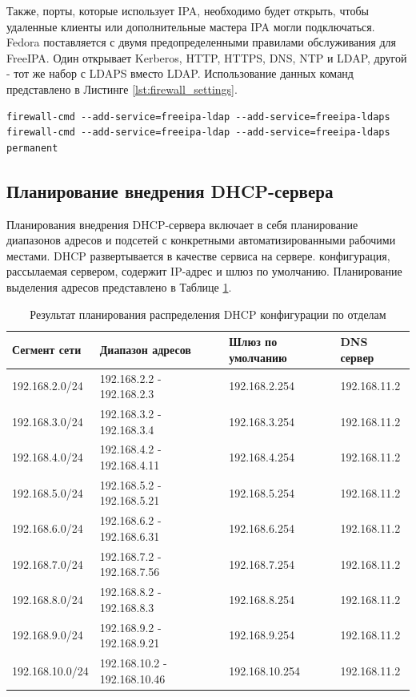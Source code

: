 \documentclass[14pt, a4paper]{extarticle}
\numberwithin{equation}{section}
\begin{document}
Также, порты, которые использует IPA, необходимо будет 
открыть, чтобы удаленные клиенты или дополнительные мастера IPA могли подключаться. 
Fedora поставляется с двумя предопределенными правилами обслуживания для FreeIPA. 
Один открывает Kerberos, HTTP, HTTPS, DNS, NTP и LDAP, другой - тот же набор с LDAPS вместо LDAP. 
Использование данных команд представлено в Листинге \ref{lst:firewall_settings}. 
\begin{lstlisting}[caption={Команды брандмауэра\label{lst:firewall_settings}}]
firewall-cmd --add-service=freeipa-ldap --add-service=freeipa-ldaps 
firewall-cmd --add-service=freeipa-ldap --add-service=freeipa-ldaps permanent 
\end{lstlisting}


\subsection{Планирование внедрения DHCP-сервера}
Планирования внедрения DHCP-сервера включает в себя планирование 
диапазонов адресов и подсетей с конкретными автоматизированными рабочими местами.
DHCP развертывается в качестве сервиса на сервере. 
конфигурация, рассылаемая сервером, содержит IP-адрес и шлюз по умолчанию.
Планирование выделения адресов представлено в Таблице \ref{table:dhcp_plan}.

\begin{table}[H]
\centering
\small
\caption{Результат планирования распределения DHCP конфигурации по отделам}
\label{table:dhcp_plan}
\begin{tabular}{|l|l|m{2.5cm}|m{2.5cm}|}
\hline
\textbf{Сегмент сети} & \textbf{Диапазон адресов} & \textbf{Шлюз по умолчанию} & \textbf{DNS сервер}\\
\hline
192.168.2.0/24 & 192.168.2.2 - 192.168.2.3 & 192.168.2.254  & 192.168.11.2\\
\hline
192.168.3.0/24 & 192.168.3.2 - 192.168.3.4 & 192.168.3.254 & 192.168.11.2\\
\hline
192.168.4.0/24 & 192.168.4.2 - 192.168.4.11 & 192.168.4.254 & 192.168.11.2\\
\hline
192.168.5.0/24 & 192.168.5.2 - 192.168.5.21 & 192.168.5.254 & 192.168.11.2\\
\hline
192.168.6.0/24 & 192.168.6.2 - 192.168.6.31 & 192.168.6.254 & 192.168.11.2\\
\hline
192.168.7.0/24 & 192.168.7.2 - 192.168.7.56 & 192.168.7.254 & 192.168.11.2\\
\hline
192.168.8.0/24 & 192.168.8.2 - 192.168.8.3 & 192.168.8.254 & 192.168.11.2\\
\hline
192.168.9.0/24 & 192.168.9.2 - 192.168.9.21 & 192.168.9.254 & 192.168.11.2 \\
\hline
192.168.10.0/24 & 192.168.10.2 - 192.168.10.46 & 192.168.10.254 & 192.168.11.2\\
\hline
\end{tabular}
\end{table}
\end{document}
